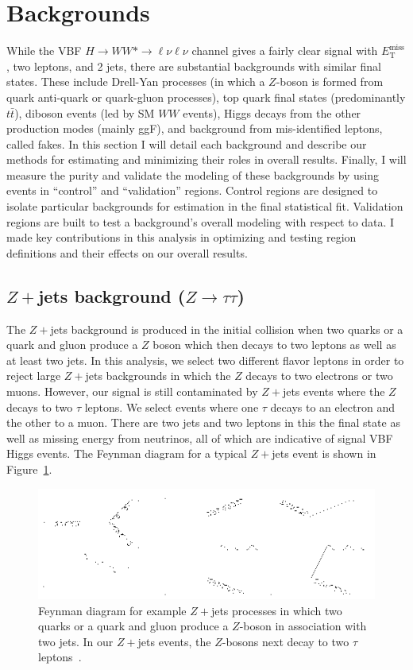 \section{Backgrounds}
While the VBF $H\rightarrow WW*\rightarrow \ell\nu\ell\nu$ channel gives a fairly clear signal with $E_{\text{T}}^{\text{miss}}$, two leptons, and 2 jets, there are substantial backgrounds with similar final states. These include Drell-Yan processes (in which a $Z$-boson is formed from quark anti-quark  or quark-gluon processes), top quark final states (predominantly $t\bar{t}$), diboson events (led by SM $WW$ events), Higgs decays from the other production modes (mainly ggF), and background from mis-identified leptons, called fakes. In this section I will detail each background and describe our methods for estimating and minimizing their roles in overall results. Finally, I will measure the purity and validate the modeling of these backgrounds by using events in ``control'' and ``validation'' regions. Control regions are designed to isolate particular backgrounds for estimation in the final statistical fit. Validation regions are built to test a background's overall modeling with respect to data.  I made key contributions in this analysis in optimizing and testing region definitions and their effects on our overall results. 

\subsection{$Z+$jets background ($Z\rightarrow \tau\tau$)}
The $Z+$jets background is produced in the initial collision when two quarks or a quark and gluon produce a $Z$ boson which then decays to two leptons as well as at least two jets. In this analysis, we select two different flavor leptons in order to reject large $Z+$jets backgrounds in which the $Z$ decays to two electrons or two muons. However, our signal is still contaminated by $Z+$jets events where the $Z$ decays to two $\tau$ leptons. We select events where one $\tau$ decays to an electron and the other to a muon. There are two jets and two leptons in this the final state as well as missing energy from neutrinos, all of which are indicative of signal VBF Higgs events. The Feynman diagram for a typical $Z+$jets event is shown in Figure~\ref{fig:Z+jets}. 

\begin{figure}
\centering
\includegraphics[width=.75\linewidth]{Pictures/Z+jets.png}
\caption{Feynman diagram for example $Z+$jets processes in which two quarks or a quark and gluon produce a $Z$-boson in association with two jets. In our $Z+$jets events, the $Z$-bosons next decay to two $\tau$ leptons~\cite{Z+jets}.}
\label{fig:Z+jets}
\end{figure}

